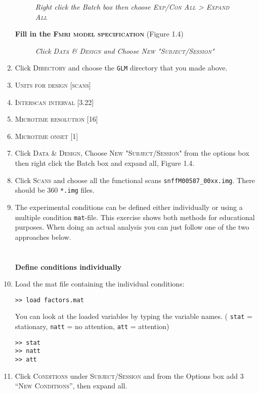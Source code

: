 \begin{enumerate}
\begin{figure}[!ht]
\centering{}
\caption{ \em{Right click the Batch box then choose \textsc{Exp/Con All > Expand All}}}
\label{ppi_fig3}
\end{figure}

\textbf{Fill in the \textsc{Fmri model specification}} (Figure 1.4)

\begin{figure}[!ht]
\centering{}
\caption{\em Click \textsc{Data \& Design} and Choose \textsc{New "Subject/Session"}}
\label{ppi_fig4}
\end{figure}


\item Click \textsc{Directory} and choose the \texttt{GLM} directory that you made above.
\item \textsc{Units for design} [\textsc{scans}]
\item \textsc{Interscan interval} [3.22]
\item \textsc{Microtime resolution} [16]
\item \textsc{Microtime onset} [1]
\item Click \textsc{Data \& Design}, Choose \textsc{New "Subject/Session"} from the options box then right click the Batch box and expand all, Figure 1.4.
\item Click \textsc{Scans} and choose all the functional scans \texttt{snffM00587\_00xx.img}. There should be 360 \texttt{*.img} files.
\item The experimental conditions can be defined either individually or using a multiple condition \texttt{mat}-file. This exercise shows both methods for educational purposes. When doing an actual analysis you can just follow one of the two approaches below.\\\\\\
\textbf{Define conditions individually}\\
\item Load the mat file containing the individual conditions:
\begin{verbatim}
>> load factors.mat
\end{verbatim}
You can look at the loaded variables by typing the variable names.
( \texttt{stat} = stationary, \texttt{natt} = no attention, \texttt{att} = attention)
\begin{verbatim}
>> stat
>> natt
>> att
\end{verbatim}
\item Click \textsc{Conditions} under \textsc{Subject/Session} and from the Options box add 3 \textsc{``New Conditions''}, then expand all.


\end{enumerate}
